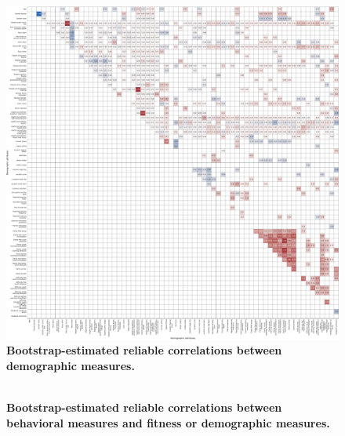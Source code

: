 \documentclass[10pt]{article}
\begin{document}
\begin{figure}[p]
\centering
\includegraphics[width=\textwidth]{figs/survey_survey_correlations}
\caption{\textbf{Bootstrap-estimated reliable correlations between
    demographic measures.}}
\label{fig:survey_corrs}
\end{figure}

\begin{figure}
\centering
\includegraphics[width=\textwidth]{figs/behavior_fitness+survey_correlations}
\caption{\textbf{Bootstrap-estimated reliable correlations between
    behavioral measures and fitness or demographic measures.}}
\label{fig:survey_corrs}
\end{figure}



\end{document}
